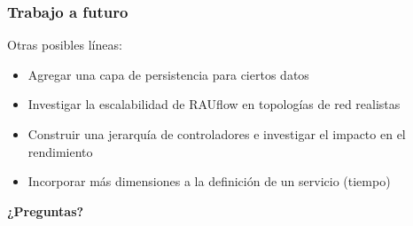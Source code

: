 \documentclass{beamer}
\begin{document}
\begin{frame}
\frametitle{Trabajo a futuro} 

Otras posibles l\'ineas:
\pause
\begin{itemize}[<+->]

\item Agregar una capa de persistencia para ciertos datos

\item Investigar la escalabilidad de RAUflow en topolog\'ias de red realistas 

\item Construir una jerarqu\'ia de controladores e investigar el impacto en el rendimiento 

\item Incorporar m\'as dimensiones a la definici\'on de un servicio (tiempo)

\end{itemize}

\end{frame}

\begin{frame}
\centering
\Huge
\textbf{¿Preguntas?}

\end{frame}


\end{document}
